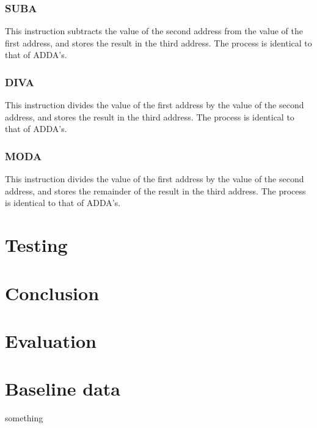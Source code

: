 \documentclass[a4paper,11pt]{article}
\begin{document}
        \subsubsection{SUBA}
            This instruction subtracts the value of the second address from the value of the first address, and stores the result in the third address. The process is identical to that of ADDA's.
            
        \subsubsection{DIVA}
            This instruction divides the value of the first address by the value of the second address, and stores the result in the third address. The process is identical to that of ADDA's.
            
        \subsubsection{MODA}
            This instruction divides the value of the first address by the value of the second address, and stores the remainder of the result in the third address. The process is identical to that of ADDA's.
    
\section{Testing}

\section{Conclusion}
\section{Evaluation}

\begin{appendices}
    \label{appendix}
    \section{Baseline data}
    \label{dat:baseline}
        something
\end{appendices}



\end{document}
